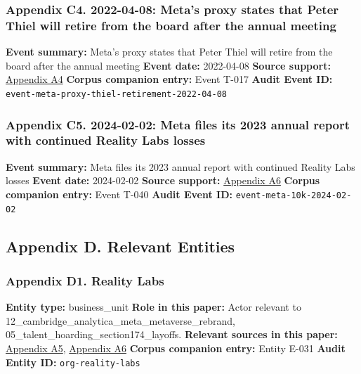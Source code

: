 \documentclass[
  american,
  11pt,
  letterpaper,
]{article}
\begin{document}
\subsubsection{Appendix C4. 2022-04-08: Meta's proxy states that Peter
Thiel will retire from the board after the annual
meeting}\label{appendix-c4-2022-04-08-meta-s-proxy-states-that-peter-thiel-will-retire-from-the-board-after-the-annual-meeting}

\textbf{Event summary:} Meta's proxy states that Peter Thiel will retire
from the board after the annual meeting \textbf{Event date:} 2022-04-08
\textbf{Source support:}
\hyperref[appendix-a4-meta-platforms-inc-2022-definitive-proxy-statement]{Appendix
A4} \textbf{Corpus companion entry:} Event T-017 \textbf{Audit Event
ID:} \texttt{event-meta-proxy-thiel-retirement-2022-04-08}

\subsubsection{Appendix C5. 2024-02-02: Meta files its 2023 annual
report with continued Reality Labs
losses}\label{appendix-c5-2024-02-02-meta-files-its-2023-annual-report-with-continued-reality-labs-losses}

\textbf{Event summary:} Meta files its 2023 annual report with continued
Reality Labs losses \textbf{Event date:} 2024-02-02 \textbf{Source
support:}
\hyperref[appendix-a6-meta-platforms-inc-2023-annual-report-form-10-k]{Appendix
A6} \textbf{Corpus companion entry:} Event T-040 \textbf{Audit Event
ID:} \texttt{event-meta-10k-2024-02-02}

\subsection{Appendix D. Relevant
Entities}\label{appendix-d.-relevant-entities}

\subsubsection{Appendix D1. Reality
Labs}\label{appendix-d1-reality-labs}

\textbf{Entity type:} business\_unit \textbf{Role in this paper:} Actor
relevant to 12\_cambridge\_analytica\_meta\_metaverse\_rebrand,
05\_talent\_hoarding\_section174\_layoffs. \textbf{Relevant sources in
this paper:}
\hyperref[appendix-a5-the-facebook-company-is-now-meta]{Appendix A5},
\hyperref[appendix-a6-meta-platforms-inc-2023-annual-report-form-10-k]{Appendix
A6} \textbf{Corpus companion entry:} Entity E-031 \textbf{Audit Entity
ID:} \texttt{org-reality-labs}
\end{document}
